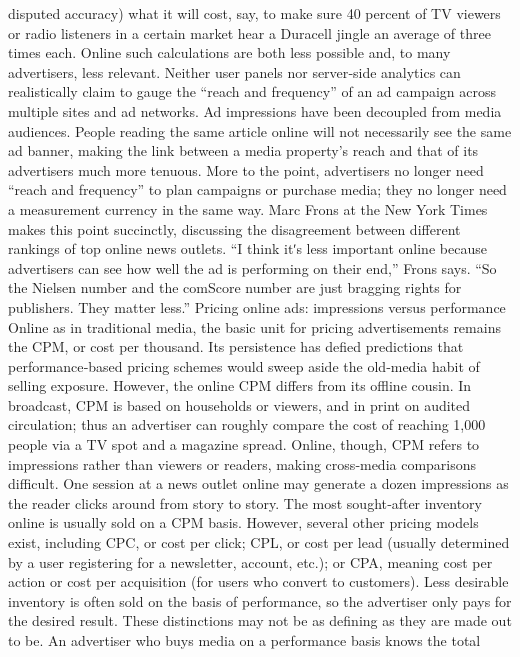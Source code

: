 disputed accuracy) what it will cost, say, to make sure 40 percent of TV
viewers or radio listeners in a certain market hear a Duracell jingle an
average of three times each.
Online such calculations are both less possible and, to many advertisers,
less relevant. Neither user panels nor server‐side analytics can realistically
claim to gauge the ``reach and frequency'' of an ad campaign across
multiple sites and ad networks. Ad impressions have been decoupled
from media audiences. People reading the same article online will not
necessarily see the same ad banner, making the link between a media
property’s reach and that of its advertisers much more tenuous. More to
the point, advertisers no longer need ``reach and frequency'' to plan
campaigns or purchase media; they no longer need a measurement
currency in the same way.
Marc Frons at the New York Times makes this point succinctly, discussing
the disagreement between different rankings of top online news outlets. ``I
think itʹs less important online because advertisers can see how well the
ad is performing on their end,'' Frons says. ``So the Nielsen number and
the comScore number are just bragging rights for publishers. They matter
less.''
Pricing online ads: impressions versus performance
Online as in traditional media, the basic unit for pricing advertisements
remains the CPM, or cost per thousand. Its persistence has defied
predictions that performance‐based pricing schemes would sweep aside
the old‐media habit of selling exposure.
However, the online CPM differs from its offline cousin. In broadcast,
CPM is based on households or viewers, and in print on audited
circulation; thus an advertiser can roughly compare the cost of reaching
1,000 people via a TV spot and a magazine spread. Online, though, CPM
refers to impressions rather than viewers or readers, making cross‐media
comparisons difficult. One session at a news outlet online may generate a
dozen impressions as the reader clicks around from story to story.
The most sought‐after inventory online is usually sold on a CPM basis.
However, several other pricing models exist, including CPC, or cost
per click; CPL, or cost per lead (usually determined by a user registering
for a newsletter, account, etc.); or CPA, meaning cost per action or cost
per acquisition (for users who convert to customers). Less desirable
inventory is often sold on the basis of performance, so the advertiser only
pays for the desired result.
These distinctions may not be as defining as they are made out to be. An
advertiser who buys media on a performance basis knows the total
